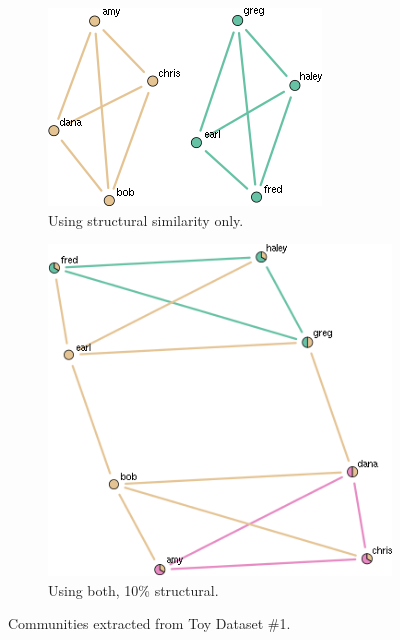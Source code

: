 \documentclass{report} %
\begin{document}
\begin{figure}
\centering
\begin{subfigure}{.5\textwidth}
  \centering
  \includegraphics[width=.8\linewidth]{toy2/no_ea/edge_comm.png}
  \caption{Using structural similarity only.}
  \label{fig:sub1}
\end{subfigure}%
\begin{subfigure}{.5\textwidth}
  \centering
  \includegraphics[width=.9\linewidth]{toy2/ea/edge_comm_0.1.png}
  \caption{Using both, 10\% structural.}
  \label{fig:sub2}
\end{subfigure}
\caption{Communities extracted from Toy Dataset \#1.}
\label{fig:test}
\end{figure}

\end{document}
